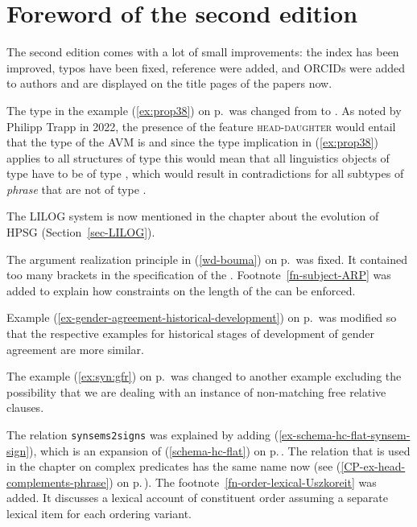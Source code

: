 \section*{Foreword of the second edition}

\largerpage
The second edition comes with a lot of small improvements: the index has been improved, typos have
been fixed, reference were added, and ORCIDs were added to authors and are displayed on the title pages of the papers now.

The type in the example (\ref{ex:prop38})
on p.\,\pageref{ex:prop38} was changed from  to . As noted by
Philipp Trapp in 2022, the presence of the feature \textsc{head-daughter} would entail that the type
of the AVM is  and since the type implication in (\ref{ex:prop38}) applies to all
structures of type  this would mean that all linguistics objects of type  have to be
of type , which would result in contradictions for all subtypes of \emph{phrase}
that are not of type .

The LILOG system is now mentioned in the chapter about the evolution of HPSG (Section~\ref{sec-LILOG}).

The argument realization principle in (\ref{wd-bouma}) on p.\,\pageref{wd-bouma} was fixed. It
contained too many brackets in the specification of the \depsl. Footnote~\ref{fn-subject-ARP} was
added to explain how constraints on the length of the \subjl can be enforced.

Example (\ref{ex-gender-agreement-historical-development}) on
p.\,\pageref{ex-gender-agreement-historical-development} was modified so that the respective
examples for historical stages of development of gender agreement are more similar.

The example (\ref{ex:syn:gfr}) on p.\,\pageref{ex:syn:gfr} was changed to another example excluding the possibility that we
are dealing with an instance of non-matching free relative clauses.

The relation \texttt{synsems2signs} was explained by adding (\ref{ex-schema-hc-flat-synsem-sign}),
which is an expansion of (\ref{schema-hc-flat}) on p.\,\pageref{schema-hc-flat}. The relation that
is used in the chapter on complex predicates has the same name now (see
(\ref{CP-ex-head-complements-phrase}) on p.\,\pageref{CP-ex-head-complements-phrase}). The
footnote~\ref{fn-order-lexical-Uszkoreit} was added. It discusses a lexical account of constituent
order assuming a separate lexical item for each ordering variant.

